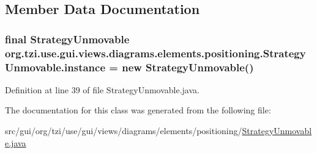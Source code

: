 \subsection{Member Data Documentation}
\hypertarget{classorg_1_1tzi_1_1use_1_1gui_1_1views_1_1diagrams_1_1elements_1_1positioning_1_1_strategy_unmovable_a345fe0509be11915fa6f6de9f589c865}{
\subsubsection[{instance}]{\setlength{\rightskip}{0pt plus 5cm}final {\bf Strategy\-Unmovable} org.\-tzi.\-use.\-gui.\-views.\-diagrams.\-elements.\-positioning.\-Strategy\-Unmovable.\-instance = new {\bf Strategy\-Unmovable}()\hspace{0.3cm}{\ttfamily [static]}}}\label{classorg_1_1tzi_1_1use_1_1gui_1_1views_1_1diagrams_1_1elements_1_1positioning_1_1_strategy_unmovable_a345fe0509be11915fa6f6de9f589c865}


Definition at line 39 of file Strategy\-Unmovable.\-java.



The documentation for this class was generated from the following file\-:\begin{DoxyCompactItemize}
\item 
src/gui/org/tzi/use/gui/views/diagrams/elements/positioning/\hyperlink{_strategy_unmovable_8java}{Strategy\-Unmovable.\-java}\end{DoxyCompactItemize}
